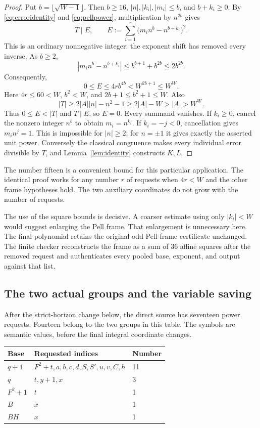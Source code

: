 \documentclass[11pt,letterpaper]{article}
\theoremstyle{definition}\newtheorem{definition}[theorem]{Definition}
\theoremstyle{remark}\newtheorem{remark}[theorem]{Remark}
\begin{document}
\begin{proof}
Put \(b=\lfloor\sqrt{W-1}\rfloor\). Then \(b\ge16\),
\(|n|,|k_i|,|m_i|\le b\), and \(b+k_i\ge0\). By
\eqref{eq:erroridentity} and \eqref{eq:pellpower}, multiplication by
\(n^{2b}\) gives
\[
T\mid E,\qquad
E:=\sum_{i=1}^r\bigl(m_i n^b-n^{b+k_i}\bigr)^2.
\]
This is an ordinary nonnegative integer: the exponent shift has removed
every inverse. As \(b\ge2\),
\[
|m_i n^b-n^{b+k_i}|
 \le b^{b+1}+b^{2b}\le2b^{2b}.
\]
Consequently,
\begin{equation}\label{eq:smallerror}
0\le E\le4r b^{4b}<W^{2b+1}\le W^W.
\end{equation}
Here \(4r\le60<W\), \(b^2<W\), and
\(2b+1\le b^2+1\le W\). Also
\[
|T|\ge2|A||n|-n^2-1\ge2|A|-W>|A|>W^W.
\]
Thus \(0\le E<|T|\) and \(T\mid E\), so \(E=0\). Every summand
vanishes. If \(k_i\ge0\), cancel the nonzero integer \(n^b\) to obtain
\(m_i=n^{k_i}\). If \(k_i=-j<0\), cancellation gives
\(m_i n^j=1\). This is impossible for \(|n|\ge2\); for \(n=\pm1\)
it gives exactly the asserted unit power. Conversely the classical
congruence makes every individual error divisible by \(T\), and
Lemma~\ref{lem:identity} constructs \(K,L\).
\end{proof}

The number fifteen is a convenient bound for this particular application.
The identical proof works for any number \(r\) of requests when
\(4r<W\) and the other frame hypotheses hold. The two auxiliary
coordinates do not grow with the number of requests.

The use of the square bounds is decisive. A coarser estimate using only
\(|k_i|<W\) would suggest enlarging the Pell frame. That enlargement is
unnecessary here. The final polynomial retains the original odd Pell-frame
certificate unchanged. The finite checker reconstructs the frame as a sum
of 36 affine squares after the removed request and authenticates every
pooled base, exponent, and output against that list.

\subsection{The two actual groups and the variable saving}

After the strict-horizon change below, the direct source has seventeen
power requests. Fourteen belong to the two groups in this table.
The symbols are semantic values, before the final integral coordinate
changes.

\begin{center}
\begin{tabular}{lll}
\toprule
Base & Requested indices & Number\\
\midrule
\(q+1\) & \(F^2+t,a,b,c,d,S,S',u,v,C,h\) & 11\\
\(q\) & \(t,y+1,x\) & 3\\
\(F^2+1\) & \(t\) & 1\\
\(B\) & \(x\) & 1\\
\(BH\) & \(x\) & 1\\
\bottomrule
\end{tabular}
\end{center}
\end{document}
